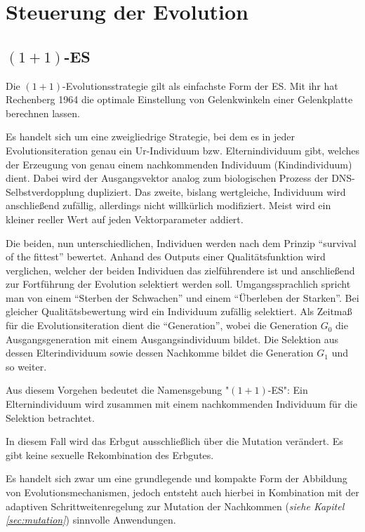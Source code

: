 
\section{Steuerung der Evolution}

\subsection{$(1+1)$-ES}

Die $(1+1)$-Evolutionsstrategie gilt als einfachste Form der ES. Mit ihr hat Rechenberg 1964 die optimale Einstellung von Gelenkwinkeln einer Gelenkplatte berechnen lassen.

Es handelt sich um eine zweigliedrige Strategie, bei dem es in jeder Evolutionsiteration genau ein Ur-Individuum bzw. Elternindividuum gibt, welches der Erzeugung von genau einem nachkommenden Individuum (Kindindividuum) dient. Dabei wird der Ausgangsvektor analog zum biologischen Prozess der DNS-Selbstverdopplung dupliziert. Das zweite, bislang wertgleiche, Individuum wird anschließend zufällig, allerdings nicht willkürlich modifiziert. Meist wird ein kleiner reeller Wert auf jeden Vektorparameter addiert.

Die beiden, nun unterschiedlichen, Individuen werden nach dem Prinzip \enquote{survival of the fittest} bewertet.
Anhand des Outputs einer Qualitätsfunktion wird verglichen, welcher der beiden Individuen das zielführendere ist und anschließend zur Fortführung der Evolution selektiert werden soll.
Umgangssprachlich spricht man von einem \enquote{Sterben der Schwachen} und einem \enquote{Überleben der Starken}.
Bei gleicher Qualitätsbewertung wird ein Individuum zufällig selektiert.
Als Zeitmaß für die Evolutionsiteration dient die \enquote{Generation}, wobei die Generation $G_0$ die Ausgangsgeneration mit einem Ausgangsindividuum bildet. Die Selektion aus dessen Elterindividuum sowie dessen Nachkomme bildet die Generation $G_1$ und so weiter.

Aus diesem Vorgehen bedeutet die Namensgebung "$(1+1)$-ES": Ein Elternindividuum wird zusammen mit einem nachkommenden Individuum für die Selektion betrachtet.

In diesem Fall wird das Erbgut ausschließlich über die Mutation verändert. Es gibt keine sexuelle Rekombination des Erbgutes.

Es handelt sich zwar um eine grundlegende und kompakte Form der Abbildung von Evolutionsmechanismen, jedoch entsteht auch hierbei in Kombination mit der adaptiven Schrittweitenregelung zur Mutation der Nachkommen (\textit{siehe Kapitel \ref{sec:mutation}}) sinnvolle Anwendungen.


